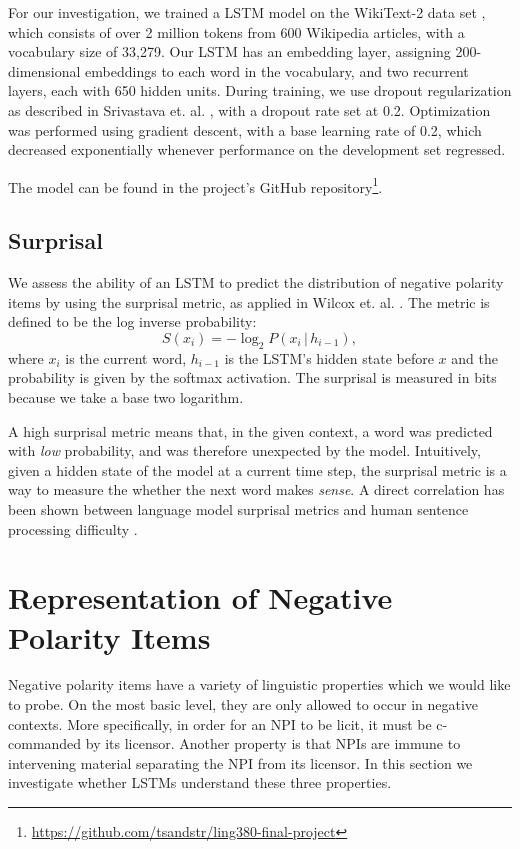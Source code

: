 \documentclass[11pt, round]{article}
\begin{document}
For our investigation, we trained a LSTM model on the WikiText-2 data set \cite{merity2016pointer}, which consists of over 2 million tokens from 600 Wikipedia articles, with a vocabulary size of 33,279. Our LSTM has an embedding layer, assigning 200-dimensional embeddings to each word in the vocabulary, and two recurrent layers, each with 650 hidden units. During training, we use dropout regularization as described in Srivastava et. al. , with a dropout rate set at 0.2. Optimization was performed using gradient descent, with a base learning rate of 0.2, which decreased exponentially whenever performance on the development set regressed.

The model can be found in the project's GitHub repository\footnote{\url{https://github.com/tsandstr/ling380-final-project}}.

\subsection{Surprisal}

We assess the ability of an LSTM to predict the distribution of negative polarity items by using the surprisal metric, as applied in Wilcox et. al. . The metric is defined to be the log inverse probability:
\[ S(x_i) = -\log_2 P(x_i \, | \, h_{i-1}), \]
where $x_i$ is the current word, $h_{i-1}$ is the LSTM's hidden state before $x$ and the probability is given by the softmax activation. The surprisal is measured in bits because we take a base two logarithm.

A high surprisal metric means that, in the given context, a word was predicted with \textit{low} probability, and was therefore unexpected by the model. Intuitively, given a hidden state of the model at a current time step, the surprisal metric is a way to measure the whether the next word makes \textit{sense}. A direct correlation has been shown between language model surprisal metrics and  human sentence processing difficulty \cite{hale2001probabilistic,levy2008expectation,smith2013effect}. 

\section{Representation of Negative Polarity Items}

Negative polarity items have a variety of linguistic properties which we would like to probe. On the most basic level, they are only allowed to occur in negative contexts. More specifically, in order for an NPI to be licit, it must be c-commanded by its licensor. Another property is that NPIs are immune to intervening material separating the NPI from its licensor. In this section we  investigate whether LSTMs understand these three properties.
\end{document}
